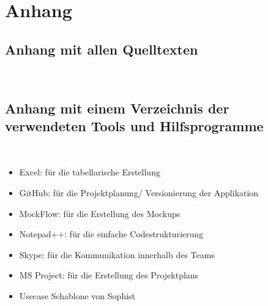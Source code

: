 \section{Anhang}

\subsection{Anhang mit allen Quelltexten}\\

\subsection{Anhang mit einem Verzeichnis der verwendeten Tools und Hilfsprogramme}\\

\begin{itemize}
\item Excel: für die tabellarische Erstellung
\item 	GitHub: für die Projektplanung/ Versionierung der Applikation
\item 	MockFlow: für die Erstellung des Mockups
\item 	Notepad++: für die einfache Codestrukturierung
\item 	Skype: für die Kommunikation innerhalb des Teams
\item 	MS Project: für die Erstellung des Projektplans
\item     Usecase Schablone von Sophist \\
\end{itemize}

